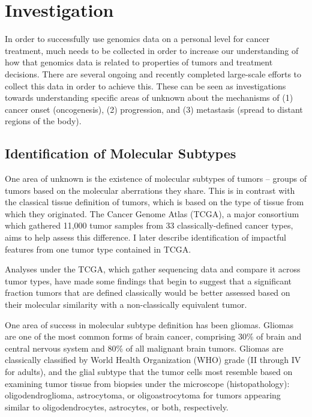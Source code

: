 \section{Investigation}
	In order to successfully use genomics data on a personal level
        for cancer treatment, much needs to be collected in order to
        increase our understanding of how that genomics data is
        related to properties of tumors and treatment decisions. There
        are several ongoing and recently completed large-scale efforts
        to collect this data in order to achieve this. These can be
        seen as investigations towards understanding specific areas of
        unknown about the mechanisms of (1) cancer onset (oncogenesis),
        (2) progression, and (3) metastasis (spread to distant regions of
        the body).


        \subsection{Identification of Molecular Subtypes}

	One area of unknown is the existence of molecular subtypes of
        tumors – groups of tumors based on the molecular aberrations
        they share. This is in contrast with the classical tissue
        definition of tumors, which is based on the type of tissue
        from which they originated. The Cancer Genome Atlas (TCGA)\cite{mclendon_comprehensive_2008}, a
        major consortium which gathered 11,000 tumor samples from 33
        classically-defined cancer types, aims to help assess this
        difference. I later describe identification of impactful
        features from one tumor type contained in TCGA. 
        
        Analyses under the TCGA, which gather sequencing data and compare it
        across tumor types, have made some findings that begin to suggest that
        a significant fraction tumors that are defined classically would be
        better assessed based on their molecular similarity with a
        non-classically equivalent tumor.

        One area of success in molecular subtype definition has been
        gliomas. Gliomas are one of the most common forms of brain
        cancer, comprising 30\% of brain and central nervous system
        and 80\% of all malignant brain tumors. Gliomas are
        classically classified by World Health Organization (WHO)
        grade (II through IV for adults), and the glial subtype that
        the tumor cells most resemble based on examining tumor tissue
        from biopsies under the microscope (histopathology):
        oligodendroglioma, astrocytoma, or oligoastrocytoma for tumors
        appearing similar to oligodendrocytes, astrocytes, or both,
        respectively. 
        

